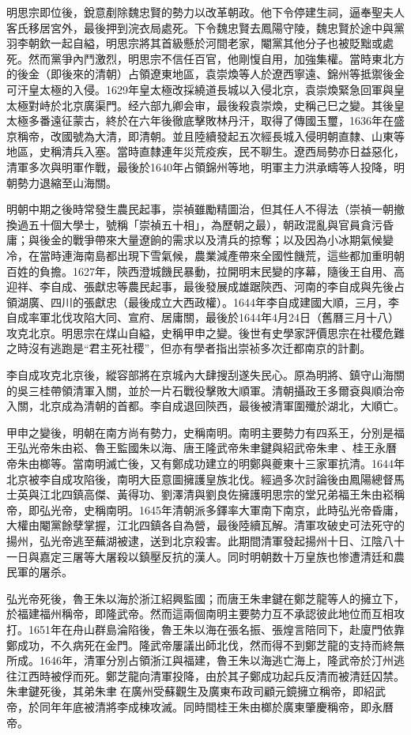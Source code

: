 明思宗即位後，銳意剷除魏忠賢的勢力以改革朝政。他下令停建生祠，逼奉聖夫人客氏移居宮外，最後押到浣衣局處死。下令魏忠賢去鳳陽守陵，魏忠賢於途中與黨羽李朝欽一起自縊，明思宗將其首級懸於河間老家，閹黨其他分子也被貶黜或處死。然而黨爭內鬥激烈，明思宗不信任百官，他剛愎自用，加強集權。當時東北方的後金（即後來的清朝）占領遼東地區，袁崇煥等人於遼西寧遠、錦州等抵禦後金可汗皇太極的入侵。1629年皇太極改採繞道長城以入侵北京，袁崇煥緊急回軍與皇太極對峙於北京廣渠門。经六部九卿会审，最後殺袁崇煥，史稱己巳之變。其後皇太極多番遠征蒙古，終於在六年後徹底擊敗林丹汗，取得了傳國玉璽，1636年在盛京稱帝，改國號為大清，即清朝。並且陸續發起五次經長城入侵明朝直隸、山東等地區，史稱清兵入塞。當時直隸連年災荒疫疾，民不聊生。遼西局勢亦日益惡化，清軍多次與明軍作戰，最後於1640年占領錦州等地，明軍主力洪承疇等人投降，明朝勢力退縮至山海關。

明朝中期之後時常發生農民起事，崇禎雖勵精圖治，但其任人不得法（崇禎一朝撤換過五十個大學士，號稱「崇禎五十相」，為歷朝之最），朝政混亂與官員貪污昏庸；與後金的戰爭帶來大量遼餉的需求以及清兵的掠奪；以及因為小冰期氣候變冷，在當時連海南島都出現下雪氣候，農業減產帶來全國性饑荒，這些都加重明朝百姓的負擔。1627年，陝西澄城饑民暴動，拉開明末民變的序幕，隨後王自用、高迎祥、李自成、張獻忠等農民起事，最後發展成雄踞陝西、河南的李自成與先後占領湖廣、四川的張獻忠（最後成立大西政權）。1644年李自成建國大順，三月，李自成率軍北伐攻陷大同、宣府、居庸關，最後於1644年4月24日（舊曆三月十八）攻克北京。明思宗在煤山自縊，史稱甲申之變。後世有史學家評價思宗在社稷危難之時沒有逃跑是“君主死社稷”，但亦有學者指出崇祯多次迁都南京的計劃。

李自成攻克北京後，縱容部將在京城內大肆搜刮遂失民心。原為明將、鎮守山海關的吳三桂帶領清軍入關，並於一片石戰役擊敗大順軍。清朝攝政王多爾袞與順治帝入關，北京成為清朝的首都。李自成退回陝西，最後被清軍圍殲於湖北，大順亡。

甲申之變後，明朝在南方尚有勢力，史稱南明。南明主要勢力有四系王，分別是福王弘光帝朱由崧、魯王監國朱以海、唐王隆武帝朱聿鍵與紹武帝朱聿𨮁、桂王永曆帝朱由榔等。當南明滅亡後，又有鄭成功建立的明鄭與夔東十三家軍抗清。1644年北京被李自成攻陷後，南明大臣意圖擁護皇族北伐。經過多次討論後由鳳陽總督馬士英與江北四鎮高傑、黃得功、劉澤清與劉良佐擁護明思宗的堂兄弟福王朱由崧稱帝，即弘光帝，史稱南明。1645年清朝派多鐸率大軍南下南京，此時弘光帝昏庸，大權由閹黨餘孽掌握，江北四鎮各自為營，最後陸續瓦解。清軍攻破史可法死守的揚州，弘光帝逃至蕪湖被逮，送到北京殺害。此期間清軍發起揚州十日、江陰八十一日與嘉定三屠等大屠殺以鎮壓反抗的漢人。同时明朝数十万皇族也惨遭清廷和農民軍的屠杀。

弘光帝死後，魯王朱以海於浙江紹興監國；而唐王朱聿鍵在鄭芝龍等人的擁立下，於福建福州稱帝，即隆武帝。然而這兩個南明主要勢力互不承認彼此地位而互相攻打。1651年在舟山群島淪陷後，魯王朱以海在張名振、張煌言陪同下，赴廈門依靠鄭成功，不久病死在金門。隆武帝屢議出師北伐，然而得不到鄭芝龍的支持而終無所成。1646年，清軍分別占領浙江與福建，魯王朱以海逃亡海上，隆武帝於汀州逃往江西時被俘而死。鄭芝龍向清軍投降，由於其子鄭成功起兵反清而被清廷囚禁。朱聿鍵死後，其弟朱聿𨮁在廣州受蘇觀生及廣東布政司顧元鏡擁立稱帝，即紹武帝，於同年年底被清將李成棟攻滅。同時間桂王朱由榔於廣東肇慶稱帝，即永曆帝。

